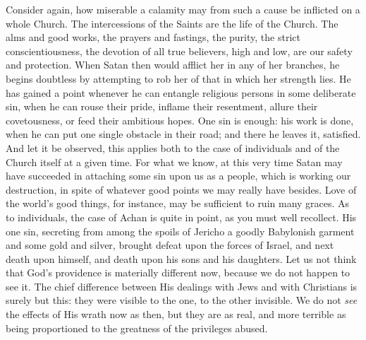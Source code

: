 Consider again, how miserable a calamity may from such a cause be
inflicted on a whole Church. The intercessions of the Saints are the
life of the Church. The alms and good works, the prayers and fastings,
the purity, the strict conscientiousness, the devotion of all true
believers, high and low, are our safety and protection. When Satan
then would afflict her in any of her branches, he begins doubtless by
attempting to rob her of that in which her strength lies. He has
gained a point whenever he can entangle religious persons in some
deliberate sin, when he can rouse their pride, inflame their
resentment, allure their covetousness, or feed their ambitious hopes.
One sin is enough: his work is done, when he can put one single
obstacle in their road; and there he leaves it, satisfied. And let it
be observed, this applies both to the case of individuals and of the
Church itself at a given time. For what we know, at this very time
Satan may have succeeded in attaching some sin upon us as a people,
which is working our destruction, in spite of whatever good points we
may really have besides. Love of the world's good things, for
instance, may be sufficient to ruin many graces. As to individuals,
the case of Achan is quite in point, as you must well recollect. His
one sin, secreting from among the spoils of Jericho a goodly
Babylonish garment and some gold and silver, brought defeat upon the
forces of Israel, and next death upon himself, and death upon his sons
and his daughters. Let us not think that God's providence is
materially different now, because we do not happen to see it. The
chief difference between His dealings with Jews and with Christians is
surely but this: they were visible to the one, to the other invisible.
We do not \emph{see} the effects of His wrath now as then, but they
are as real, and more terrible as being proportioned to the greatness
of the privileges abused.

